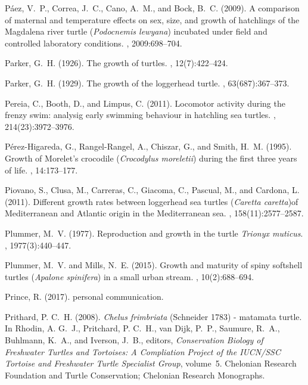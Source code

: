 \documentclass{article}
\begin{document}
\begin{thebibliography}{}
P\'{a}ez, V.~P., Correa, J.~C., Cano, A.~M., and Bock, B.~C. (2009).
\newblock A comparison of maternal and temperature effects on sex, size, and
  growth of hatchlings of the {M}agdalena river turtle (\emph{Podocnemis
  lewyana}) incubated under field and controlled laboratory conditions.
, 2009:698--704.

Parker, G.~H. (1926).
\newblock The growth of turtles.
,
  12(7):422--424.

Parker, G.~H. (1929).
\newblock The growth of the loggerhead turtle.
, 63(687):367--373.

Pereia, C., Booth, D., and Limpus, C. (2011).
\newblock Locomotor activity during the frenzy swim: analysig early swimming
  behaviour in hatchling sea turtles.
, 214(23):3972--3976.

P\'{e}rez-Higareda, G., Rangel-Rangel, A., Chiszar, G., and Smith, H.~M.
  (1995).
\newblock Growth of {M}orelet's crocodile (\emph{Crocodylus moreletii}) during
  the first three years of life.
, 14:173--177.

Piovano, S., Clusa, M., Carreras, C., Giacoma, C., Pascual, M., and Cardona, L.
  (2011).
\newblock Different growth rates between loggerhead sea turtles
  (\textit{Caretta caretta})of {M}editerranean and {A}tlantic origin in the
  {M}editerranean sea.
, 158(11):2577--2587.

Plummer, M.~V. (1977).
\newblock Reproduction and growth in the turtle \emph{Trionyx muticus}.
, 1977(3):440--447.

Plummer, M.~V. and Mills, N.~E. (2015).
\newblock Growth and maturity of spiny softshell turtles (\emph{Apalone
  spinifera}) in a small urban stream.
, 10(2):688--694.

Prince, R. (2017).
\newblock personal communication.

Prithard, P. C.~H. (2008).
\newblock \emph{Chelus frimbriata} ({S}chneider 1783) - matamata turtle.
\newblock In Rhodin, A. G.~J., Pritchard, P. C.~H., van Dijk, P.~P., Saumure,
  R.~A., Buhlmann, K.~A., and Iverson, J.~B., editors, {\em Conservation
  Biology of Freshwater Turtles and Tortoises: A Compliation Project of the
  IUCN/SSC Tortoise and Freshwater Turtle Specialist Group}, volume~5.
  Chelonian Research Foundation and Turtle Conservation; Chelonian Research
  Monographs.


\end{thebibliography}
\end{document}
